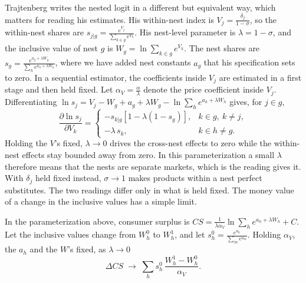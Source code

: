 Trajtenberg writes the nested logit in a different but equivalent way, which matters for reading his estimates.
His within-nest index is $V_j = \frac{\delta_j}{1-\sigma}$, so the within-nest shares are $s_{j|g} =
\frac{e^{V_j}}{\sum_{k\in g}e^{V_k}}$. His nest-level parameter is $\lambda = 1 - \sigma$, and the inclusive value
of nest $g$ is $W_g = \ln\sum_{k\in g}e^{V_k}$. The nest shares are $s_g = \frac{e^{a_g + \lambda
W_g}}{\sum_h e^{a_h + \lambda W_h}}$, where we have added nest constants $a_g$ that his specification sets to
zero. In a sequential estimator, the coefficients inside $V_j$ are estimated in a first stage and then held fixed.
Let $\alpha_V = \frac{\alpha}{\lambda}$ denote the price coefficient inside $V_j$. Differentiating $\ln s_j =
V_j - W_g + a_g + \lambda W_g - \ln\sum_h e^{a_h+\lambda W_h}$ gives, for $j\in g$,
\begin{equation}\label{eq:10-nl-semi}
\frac{\partial\ln s_j}{\partial V_k} =
\begin{cases}
-s_{k|g}\left[1 - \lambda(1 - s_g)\right], & k\in g,\ k\ne j,\\[2pt]
-\lambda\, s_k, & k\in h \ne g .
\end{cases}
\end{equation}
Holding the $V$'s fixed, $\lambda\to0$ drives the cross-nest effects to zero while the within-nest effects stay
bounded away from zero. In this parameterization a small $\lambda$ therefore means that the nests are separate
markets, which is the reading \citet[p.~43, n.~42]{Trajtenberg1985} gives it. With $\delta_j$ held fixed instead,
$\sigma\to1$ makes products within a nest perfect substitutes. The two readings differ only in what is held
fixed. The money value of a change in the inclusive values has a simple limit.

\begin{corollary}\label{cor:10-separate-markets}
In the parameterization above, consumer surplus is $CS = \frac{1}{\lambda\alpha_V}\ln\sum_h e^{a_h + \lambda W_h}
+ C$. Let the inclusive values change from $W^0_h$ to $W^1_h$, and let $s^0_h = \frac{e^{a_h}}{\sum_m e^{a_m}}$.
Holding $\alpha_V$, the $a_h$ and the $W$'s fixed, as $\lambda\to 0$
\begin{equation}\label{eq:10-separate-markets}
\Delta CS \;\to\; \sum_h s^0_h\,\frac{W^1_h - W^0_h}{\alpha_V}.
\end{equation}
\end{corollary}

